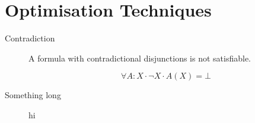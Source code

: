 \documentclass[12pt, letterpaper]{article}
\begin{document}
\section{Optimisation Techniques}

\begin{description}
    \item[Contradiction] {
        A formula with contradictional disjunctions
        is not satisfiable.
        
        \[\forall A : X \cdot \lnot X \cdot A(X) = \bot \]
    }
    \item[Something long] {
        hi
    }
 \end{description}
\end{document}
